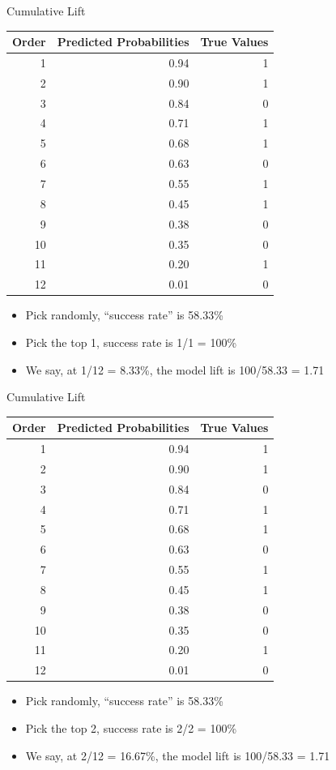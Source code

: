 \documentclass[
  ignorenonframetext,
]{beamer}
\providecommand{\tightlist}{%
  \setlength{\itemsep}{0pt}\setlength{\parskip}{0pt}}
\begin{document}
\begin{frame}{Cumulative Lift}
\protect\hypertarget{cumulative-lift-2}{}
\begin{longtable}[]{@{}rrr@{}}
\toprule
Order & Predicted Probabilities & True Values \\
\midrule
\endhead
1 & 0.94 & 1 \\
2 & 0.90 & 1 \\
3 & 0.84 & 0 \\
4 & 0.71 & 1 \\
5 & 0.68 & 1 \\
6 & 0.63 & 0 \\
7 & 0.55 & 1 \\
8 & 0.45 & 1 \\
9 & 0.38 & 0 \\
10 & 0.35 & 0 \\
11 & 0.20 & 1 \\
12 & 0.01 & 0 \\
\bottomrule
\end{longtable}

\begin{itemize}
\tightlist
\item
  Pick randomly, ``success rate'' is 58.33\%
\item
  Pick the top 1, success rate is 1/1 = 100\%
\item
  We say, at 1/12 = 8.33\%, the model lift is 100/58.33 = 1.71
\end{itemize}
\end{frame}

\begin{frame}{Cumulative Lift}
\protect\hypertarget{cumulative-lift-3}{}
\begin{longtable}[]{@{}rrr@{}}
\toprule
Order & Predicted Probabilities & True Values \\
\midrule
\endhead
1 & 0.94 & 1 \\
2 & 0.90 & 1 \\
3 & 0.84 & 0 \\
4 & 0.71 & 1 \\
5 & 0.68 & 1 \\
6 & 0.63 & 0 \\
7 & 0.55 & 1 \\
8 & 0.45 & 1 \\
9 & 0.38 & 0 \\
10 & 0.35 & 0 \\
11 & 0.20 & 1 \\
12 & 0.01 & 0 \\
\bottomrule
\end{longtable}

\begin{itemize}
\tightlist
\item
  Pick randomly, ``success rate'' is 58.33\%
\item
  Pick the top 2, success rate is 2/2 = 100\%
\item
  We say, at 2/12 = 16.67\%, the model lift is 100/58.33 = 1.71
\end{itemize}
\end{frame}
\end{document}
